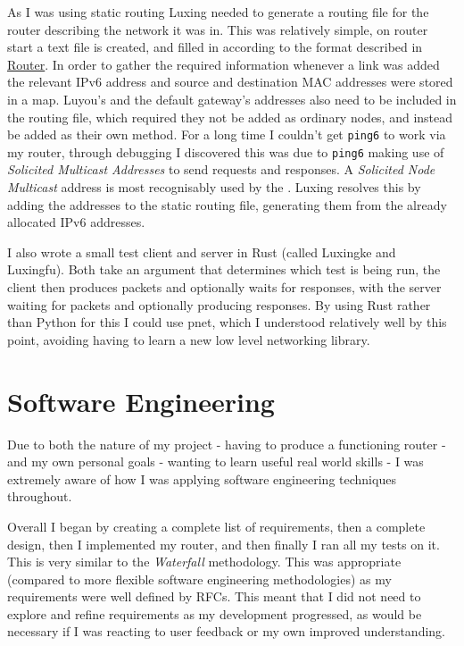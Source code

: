 \documentclass[12pt,a4paper,twoside,openright]{report}
\begin{document}
As I was using static routing Luxing needed to generate a routing file for the router describing the network it was in.  This was relatively simple, on router start a text file is created, and filled in according to the format described in \hyperref[sec::router]{Router}.  In order to gather the required information whenever a link was added the relevant IPv6 address and source and destination MAC addresses were stored in a map.  Luyou's and the default gateway's addresses also need to be included in the routing file, which required they not be added as ordinary nodes, and instead be added as their own method. For a long time I couldn't get \verb!ping6! to work via my router, through debugging I discovered this was due to \verb!ping6! making use of \textit{Solicited Multicast Addresses} to send requests and responses. A \textit{Solicited Node Multicast} address is most recognisably used by the \cite{Neighbour Discovery Protocol}\cite{ndp_rfc}. Luxing resolves this by adding the addresses to the static routing file, generating them from the already allocated IPv6 addresses.

\bigskip

I also wrote a small test client and server in Rust (called Luxingke and Luxingfu).  Both take an argument that determines which test is being run, the client then produces packets and optionally waits for responses, with the server waiting for packets and optionally producing responses.  By using Rust rather than Python for this I could use pnet, which I understood relatively well by this point, avoiding having to learn a new low level networking library.

\section{Software Engineering}
\label{sec::soft_eng}

Due to both the nature of my project - having to produce a functioning router - and my own personal goals - wanting to learn useful real world skills - I was extremely aware of how I was applying software engineering techniques throughout.

\bigskip

Overall I began by creating a complete list of requirements, then a complete design, then I implemented my router, and then finally I ran all my tests on it.  This is very similar to the \textit{Waterfall} methodology.  This was appropriate (compared to more flexible software engineering methodologies) as my requirements were well defined by RFCs. This meant that I did not need to explore and refine requirements as my development progressed, as would be necessary if I was reacting to user feedback or my own improved understanding.
\end{document}
